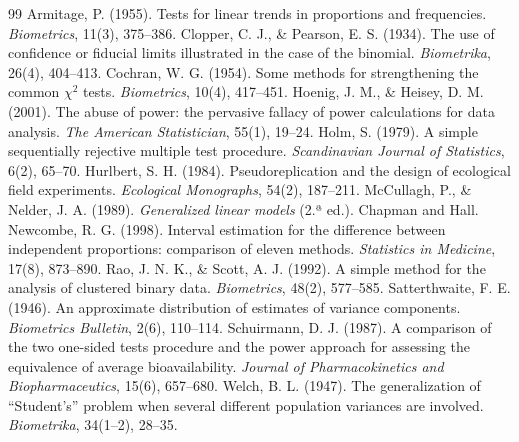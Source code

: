 \documentclass[11pt]{article}
\begin{document}
\begin{thebibliography}{99}
 Armitage, P. (1955). Tests for linear trends in proportions and frequencies. \textit{Biometrics}, 11(3), 375--386.
 Clopper, C. J., \& Pearson, E. S. (1934). The use of confidence or fiducial limits illustrated in the case of the binomial. \textit{Biometrika}, 26(4), 404--413.
 Cochran, W. G. (1954). Some methods for strengthening the common $\chi^2$ tests. \textit{Biometrics}, 10(4), 417--451.
 Hoenig, J. M., \& Heisey, D. M. (2001). The abuse of power: the pervasive fallacy of power calculations for data analysis. \textit{The American Statistician}, 55(1), 19--24.
 Holm, S. (1979). A simple sequentially rejective multiple test procedure. \textit{Scandinavian Journal of Statistics}, 6(2), 65--70.
 Hurlbert, S. H. (1984). Pseudoreplication and the design of ecological field experiments. \textit{Ecological Monographs}, 54(2), 187--211.
 McCullagh, P., \& Nelder, J. A. (1989). \textit{Generalized linear models} (2.ª ed.). Chapman and Hall.
 Newcombe, R. G. (1998). Interval estimation for the difference between independent proportions: comparison of eleven methods. \textit{Statistics in Medicine}, 17(8), 873--890.
 Rao, J. N. K., \& Scott, A. J. (1992). A simple method for the analysis of clustered binary data. \textit{Biometrics}, 48(2), 577--585.
 Satterthwaite, F. E. (1946). An approximate distribution of estimates of variance components. \textit{Biometrics Bulletin}, 2(6), 110--114.
 Schuirmann, D. J. (1987). A comparison of the two one-sided tests procedure and the power approach for assessing the equivalence of average bioavailability. \textit{Journal of Pharmacokinetics and Biopharmaceutics}, 15(6), 657--680.
 Welch, B. L. (1947). The generalization of ``Student's'' problem when several different population variances are involved. \textit{Biometrika}, 34(1--2), 28--35.
\end{thebibliography}
\end{document}
